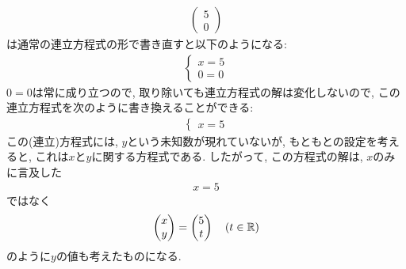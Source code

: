 \begin{example}
\begin{align*}
            \begin{pmatrix}5\\0\end{pmatrix}
  \end{align*}
  は通常の連立方程式の形で書き直すと以下のようになる:
  \begin{align*}
    \begin{cases}
      x=5\\
      0=0
    \end{cases}
  \end{align*}
  $0=0$は常に成り立つので, 取り除いても連立方程式の解は変化しないので,
  この連立方程式を次のように書き換えることができる:
  \begin{align*}
    \begin{cases}
      x=5
    \end{cases}
  \end{align*}
  この(連立)方程式には, $y$という未知数が現れていないが, もともとの設定を考えると, これは$x$と$y$に関する方程式である.
  したがって, この方程式の解は, $x$のみに言及した
  \begin{align*}
    x=5
  \end{align*}
  ではなく
  \begin{align*}
    \begin{pmatrix}x\\y\end{pmatrix}=\begin{pmatrix}5\\t\end{pmatrix}\quad (t\in\mathbb{R})
  \end{align*}
  のように$y$の値も考えたものになる.
\end{example}


